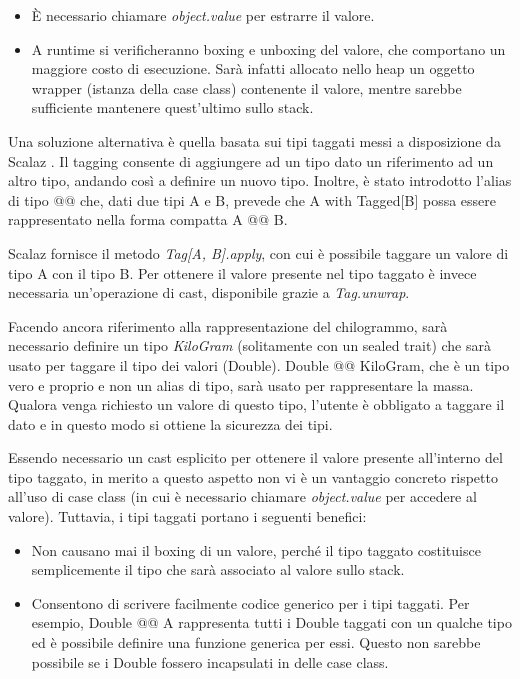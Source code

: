 \begin{itemize}
\item È necessario chiamare \textit{object.value} per estrarre il valore.
\item A runtime si verificheranno boxing e unboxing del valore, che comportano un maggiore costo di esecuzione. Sarà infatti allocato nello heap un oggetto wrapper (istanza della case class) contenente il valore, mentre sarebbe sufficiente mantenere quest'ultimo sullo stack.
\end{itemize}

Una soluzione alternativa è quella basata sui tipi taggati messi a disposizione da Scalaz \cite{TagTypes}. Il tagging consente di aggiungere ad un tipo dato un riferimento ad un altro tipo, andando così a definire un nuovo tipo. Inoltre, è stato introdotto l'alias di tipo @@ che, dati due tipi A e B, prevede che A with Tagged[B] possa essere rappresentato nella forma compatta A @@ B.

Scalaz fornisce il metodo \textit{Tag[A, B].apply}, con cui è possibile taggare un valore di tipo A con il tipo B. Per ottenere il valore presente nel tipo taggato è invece necessaria un'operazione di cast, disponibile grazie a \textit{Tag.unwrap}.

Facendo ancora riferimento alla rappresentazione del chilogrammo, sarà necessario definire un tipo \textit{KiloGram} (solitamente con un sealed trait) che sarà usato per taggare il tipo dei valori (Double). Double @@ KiloGram, che è un tipo vero e proprio e non un alias di tipo, sarà usato per rappresentare la massa. Qualora venga richiesto un valore di questo tipo, l'utente è obbligato a taggare il dato e in questo modo si ottiene la sicurezza dei tipi.



Essendo necessario un cast esplicito per ottenere il valore presente all'interno del tipo taggato, in merito a questo aspetto non vi è un vantaggio concreto rispetto all'uso di case class (in cui è necessario chiamare \textit{object.value} per accedere al valore). Tuttavia, i tipi taggati portano i seguenti benefici:

\begin{itemize}
\item Non causano mai il boxing di un valore, perché il tipo taggato costituisce semplicemente il tipo che sarà associato al valore sullo stack.
\item Consentono di scrivere facilmente codice generico per i tipi taggati. Per esempio, Double @@ A rappresenta tutti i Double taggati con un qualche tipo ed è possibile definire una funzione generica per essi. Questo non sarebbe possibile se i Double fossero incapsulati in delle case class.
\end{itemize}

